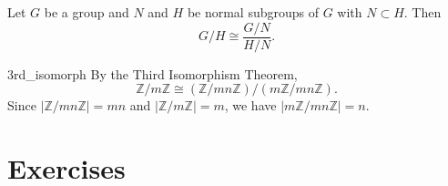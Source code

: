  
\begin{theorem}\label{ThirdIsoTheorem}
Let $G$ be a group and $N$ and $H$ be normal subgroups of $G$ with $N
\subset H$.  Then 
\[
G/H \cong \frac{G/N}{H/N}.
\]
\end{theorem}
 
 
\begin{example}{3rd_isomorph}
By the Third Isomorphism Theorem,
\[
{\mathbb Z} / m {\mathbb Z} \cong ({\mathbb Z}/ mn {\mathbb Z})/ (m {\mathbb Z}/ mn
{\mathbb Z}). 
\]
Since $| {\mathbb Z} / mn {\mathbb Z} | = mn$ and  $|{\mathbb Z} / m{\mathbb Z}| =
m$, we have $| m {\mathbb Z} / mn {\mathbb Z}| = n$. 
\end{example}
 
 
\section*{Exercises}
\exrule
 
 
 
